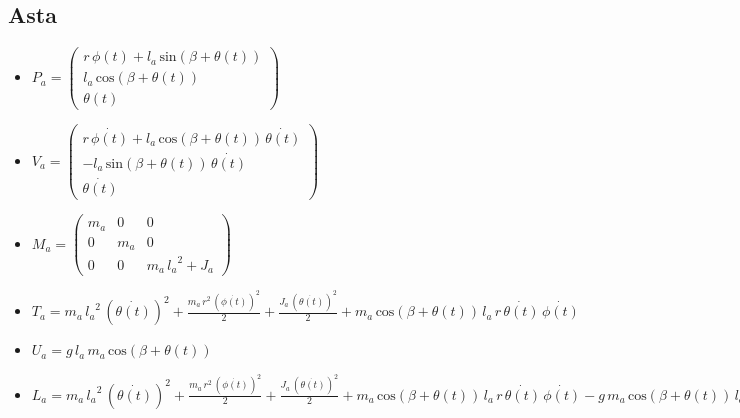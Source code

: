 \subsection{Asta}
\begin{itemize}
	\item \textbf{$P_a = \left(\begin{array}{c}
		r\,\phi \left(t\right)+l_a \,\mathrm{sin}\left(\beta +\theta \left(t\right)\right)\\
		l_a \,\mathrm{cos}\left(\beta +\theta \left(t\right)\right)\\
		\theta \left(t\right)
		\end{array}\right)$}

	\item \textbf{$V_a = \left(\begin{array}{c}
		r\,\dot{\phi \left(t\right)}+l_a \,\mathrm{cos}\left(\beta +\theta \left(t\right)\right)\,\dot{\theta \left(t\right)}\\
		-l_a \,\mathrm{sin}\left(\beta +\theta \left(t\right)\right)\,\dot{\theta \left(t\right)}\\
		\dot{\theta \left(t\right)}
		\end{array}\right)$}
	
	\item \textbf{$M_a = \left(\begin{array}{ccc}
		m_a  & 0 & 0\\
		0 & m_a  & 0\\
		0 & 0 & m_a \,{l_a }^2 +J_a 
		\end{array}\right)$}
	
	\item \textbf{$T_a = m_a \,{l_a }^2 \,{{\left(\dot{\theta \left(t\right)}\right)}}^2 +\frac{m_a \,r^2 \,{{\left(\dot{\phi \left(t\right)}\right)}}^2 }{2}+\frac{J_a \,{{\left(\dot{\theta \left(t\right)}\right)}}^2 }{2}+m_a \,\mathrm{cos}\left(\beta +\theta \left(t\right)\right)\,l_a \,r\,\dot{\theta \left(t\right)}\,\dot{\phi \left(t\right)}$}
	
	\item \textbf{$U_a = g\,l_a \,m_a \,\mathrm{cos}\left(\beta +\theta \left(t\right)\right)$}
	
	\item \textbf{$L_a = m_a \,{l_a }^2 \,{{\left(\dot{\theta \left(t\right)}\right)}}^2 +\frac{m_a \,r^2 \,{{\left(\dot{\phi \left(t\right)}\right)}}^2 }{2}+\frac{J_a \,{{\left(\dot{\theta \left(t\right)}\right)}}^2 }{2}+m_a \,\mathrm{cos}\left(\beta +\theta \left(t\right)\right)\,l_a \,r\,\dot{\theta \left(t\right)}\,\dot{\phi \left(t\right)}-g\,m_a \,\mathrm{cos}\left(\beta +\theta \left(t\right)\right)\,l_a$}
\end{itemize}
